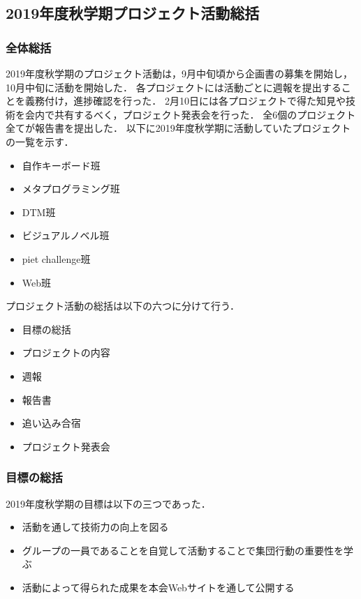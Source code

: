 \subsection*{2019年度秋学期プロジェクト活動総括}


\subsubsection*{全体総括}
2019年度秋学期のプロジェクト活動は，9月中旬頃から企画書の募集を開始し，10月中旬に活動を開始した．
各プロジェクトには活動ごとに週報を提出することを義務付け，進捗確認を行った．
2月10日には各プロジェクトで得た知見や技術を会内で共有するべく，プロジェクト発表会を行った．
全6個のプロジェクト全てが報告書を提出した．
以下に2019年度秋学期に活動していたプロジェクトの一覧を示す．

\begin{itemize}
\item 自作キーボード班
\item メタプログラミング班
\item DTM班
\item ビジュアルノベル班
\item piet challenge班
\item Web班
\end{itemize}

プロジェクト活動の総括は以下の六つに分けて行う．

\begin{itemize}
\item 目標の総括
\item プロジェクトの内容
\item 週報
\item 報告書
\item 追い込み合宿
\item プロジェクト発表会
\end{itemize}

\subsubsection*{目標の総括}
2019年度秋学期の目標は以下の三つであった．

\begin{itemize}
\item 活動を通して技術力の向上を図る
\item グループの一員であることを自覚して活動することで集団行動の重要性を学ぶ
\item 活動によって得られた成果を本会Webサイトを通して公開する
\end{itemize}

